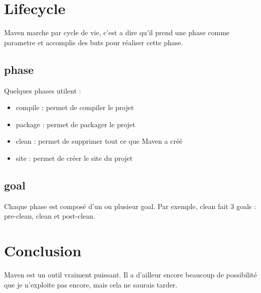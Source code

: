 \documentclass[a4paper,10pt]{article}
\begin{document}
\section{Lifecycle}
Maven marche par cycle de vie, c'est a dire qu'il prend une phase comme parametre et accomplis des buts pour réaliser cette phase.

\subsection{phase}
Quelques phases utilent :
\begin{itemize}
\item compile : permet de compiler le projet
\item package : permet de packager le projet
\item clean : permet de supprimer tout ce que Maven a créé
\item site : permet de créer le site du projet
\end{itemize}

\subsection{goal}
Chaque phase est composé d'un ou plusieur goal.
Par exemple, clean fait 3 goals : pre-clean, clean et post-clean.


\section{Conclusion}
Maven est un outil vraiment puissant. Il a d'ailleur encore beaucoup de possibilité que je n'exploite pas encore, mais cela ne saurais tarder.
\end{document}
